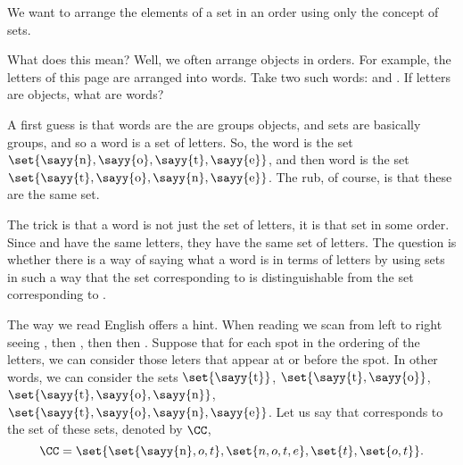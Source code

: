 

We want to arrange the elements of a set in an order using only the concept of sets.


What does this mean?  Well, we often arrange objects in orders.
For example, the letters of this page are arranged into words.
Take two such words:  and .
If letters are objects, what are words?

A first guess is that words are the are groups objects, and sets are basically groups, and so a word is a set of letters.
So, the word  is the set $\set{\text{\sayy{n}}, \text{\sayy{o}}, \text{\sayy{t}}, \text{\sayy{e}}}$, and then word  is the set
$\set{\text{\sayy{t}}, \text{\sayy{o}}, \text{\sayy{n}}, \text{\sayy{e}}}$.
The rub, of course, is that these are the same set.

The trick is that a word is not just the set of letters, it is that set in some order.
Since  and  have the same letters, they have the same set of letters.
The question is whether there is a way of saying what a word is in terms of letters by using sets in such a way that the set corresponding to  is distinguishable from the set corresponding to .

The way we read English offers a hint.
When reading  we scan from left to right seeing , then , then  then .
Suppose that for each spot in the ordering of the letters, we can consider those leters that appear at or before the spot.
In other words, we can consider the sets $\set{\text{\sayy{t}}}$, $\set{\text{\sayy{t}}, \text{\sayy{o}}}$, $\set{\text{\sayy{t}}, \text{\sayy{o}}, \text{\sayy{n}}}$, $\set{\text{\sayy{t}}, \text{\sayy{o}}, \text{\sayy{n}}, \text{\sayy{e}}}$.
Let us say that  corresponds to the set of these sets, denoted by $\CC$,
\[
  \CC = \set{\set{\text{\sayy{n}}, o, t}, \set{n, o, t, e}, \set{t}, \set{o, t}}.
\]

